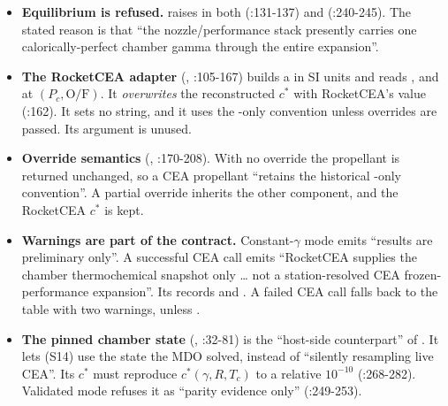 \begin{itemize}
\item \textbf{Equilibrium is refused.}  raises  in both  (:131-137) and  (:240-245). The stated reason is that ``the nozzle/performance stack presently carries one calorically-perfect chamber gamma through the entire expansion''.
\item \textbf{The RocketCEA adapter} (, :105-167) builds a  in SI units and reads ,  and  at $(P_c, \text{O/F})$. It \emph{overwrites} the reconstructed $c^*$ with RocketCEA's value (:162). It sets no  string, and it uses the -only convention unless overrides are passed. Its  argument is unused.
\item \textbf{Override semantics} (, :170-208). With no override the propellant is returned unchanged, so a CEA propellant ``retains the historical -only convention''. A partial override inherits the other component, and the RocketCEA $c^*$ is kept.
\item \textbf{Warnings are part of the contract.} Constant-$\gamma$ mode emits ``results are preliminary only''. A successful CEA call emits ``RocketCEA supplies the chamber thermochemical snapshot only \ldots{} not a station-resolved CEA frozen-performance expansion''. Its  records  and . A failed CEA call falls back to the table with two warnings, unless .
\item \textbf{The pinned chamber state} (, :32-81) is the ``host-side counterpart'' of . It lets  (S14) use the state the MDO solved, instead of ``silently resampling live CEA''. Its $c^*$ must reproduce $c^*(\gamma,R,T_c)$ to a relative $10^{-10}$ (:268-282). Validated mode refuses it as ``parity evidence only'' (:249-253).
\end{itemize}

